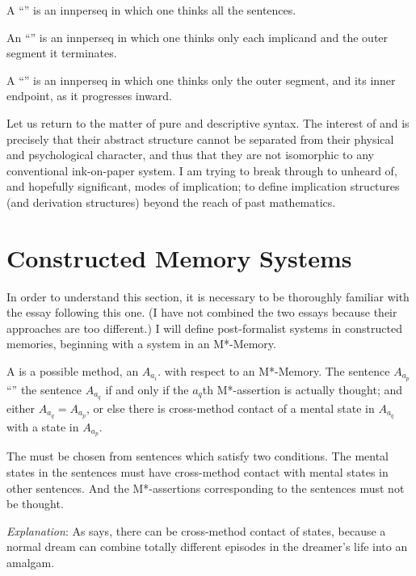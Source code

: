 
\begin{sysrules}
A \enquote{} is an innperseq in which one thinks all the 
sentences. 

An \enquote{} is an innperseq in which one thinks 
only each implicand and the outer segment it terminates. 

A \enquote{} is an innperseq in which one thinks 
only the outer segment, and its inner endpoint, as it progresses inward. 
\end{sysrules}


Let us return to the matter of pure and descriptive syntax. The interest 
of  and  is precisely that their abstract structure 
cannot be separated from their physical and psychological character, and 
thus that they are not isomorphic to any conventional ink-on-paper system. I 
am trying to break through to unheard of, and hopefully significant, modes 
of implication; to define implication structures (and derivation structures) 
beyond the reach of past mathematics. 

\clearpage
\section{Constructed Memory Systems}

In order to understand this section, it is necessary to be thoroughly 
familiar with  the essay following this 
one. (I have not combined the two essays because their approaches are too 
different.) I will define post-formalist systems in constructed memories, 
beginning with a system in an M*-Memory.


\begin{sysrules}
A  is a possible method, an $A_{a_i}$. with respect to an M*-Memory. 
The sentence $A_{a_p}$ \enquote{} the sentence $A_{a_q}$ if and only if the $a_q$th 
M*-assertion is actually thought; and either $A_{a_q} = A_{a_p}$, or else there is 
cross-method contact of a mental state in $A_{a_q}$ with a state in $A_{a_p}$.

The  must be chosen from sentences which satisfy two conditions. 
The mental states in the sentences must have cross-method contact 
with mental states in other sentences. And the M*-assertions 
corresponding to the sentences must not be thought. 

\emph{Explanation}: As  says, there can be 
cross-method contact of states, because a normal dream can 
combine totally different episodes in the dreamer's life into an 
amalgam. 
\end{sysrules}

